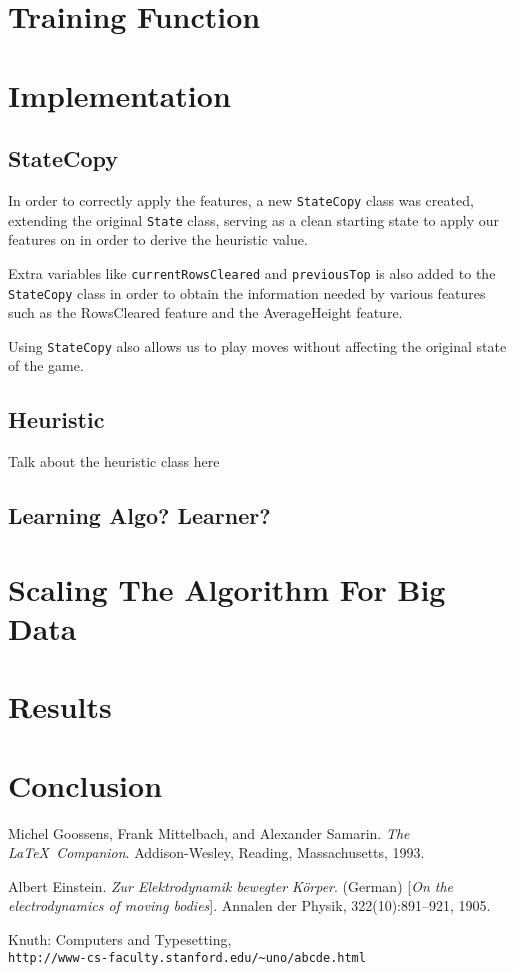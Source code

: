 \documentclass[12pt]{article}
\begin{document}
\section{Training Function}

\section{Implementation}
\subsection{StateCopy}
In order to correctly apply the features, a new \texttt{StateCopy} class was created, extending the original \texttt{State} class, serving as a clean starting state to apply our features on in order to derive the heuristic value. 

Extra variables like \texttt{currentRowsCleared} and \texttt{previousTop} is also added to the \texttt{StateCopy} class in order to obtain the information needed by various features such as the RowsCleared feature and the AverageHeight feature.

Using \texttt{StateCopy} also allows us to play moves without affecting the original state of the game.

\subsection{Heuristic}
Talk about the heuristic class here

\subsection{Learning Algo? Learner?}

\section{Scaling The Algorithm For Big Data}

\section{Results}

\section{Conclusion}



\begin{thebibliography}{12}
Michel Goossens, Frank Mittelbach, and Alexander Samarin. 
\textit{The \LaTeX\ Companion}. 
Addison-Wesley, Reading, Massachusetts, 1993.
 
Albert Einstein. 
\textit{Zur Elektrodynamik bewegter K{\"o}rper}. (German) 
[\textit{On the electrodynamics of moving bodies}]. 
Annalen der Physik, 322(10):891–921, 1905.
 
Knuth: Computers and Typesetting,
\\\texttt{http://www-cs-faculty.stanford.edu/\~{}uno/abcde.html}
\end{thebibliography}
\end{document}
